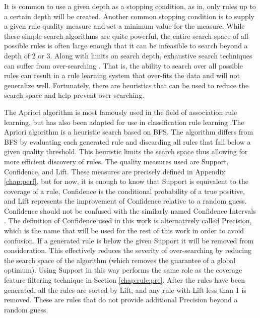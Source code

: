 It is common to use a given depth as a stopping condition, as in, only rules up to a certain depth will be created. Another common stopping condition is to supply a given rule quality measure and set a minimum value for the measure. While these simple search algorithms are quite powerful, the entire search space of all possible rules is often large enough that it can be infeasible to search beyond a depth of 2 or 3.
Along with limits on search depth, exhaustive search techniques can suffer from over-searching \cite{quinlan1995oversearching} \cite{janssen2008oversearching}. That is, the ability to search over all possible rules can result in a rule learning system that over-fits the data and will not generalize well.
 Fortunately, there are heuristics that can be used to reduce the search space and help prevent over-searching.

 The Apriori algorithm \cite{agrawal1996fast} is most famously used in the field of association rule learning, but has also been adapted for use in classification rule learning \cite{liu1998integrating} \cite{liu2000improving} \cite{jovanoski2001classification}.The Apriori algorithm is a heuristic search based on BFS. The algorithm differs from BFS by evaluating each generated rule and discarding all rules that fall below a given quality threshold. This heuristic limits the search space thus allowing for more efficient discovery of rules. The quality measures used are Support, Confidence, and Lift. These measures are precisely defined in Appendix \ref{chap:perf}, but for now, it is enough to know that Support is equivalent to the coverage of a rule, Confidence is the conditional probability of a true positive, and Lift represents the improvement of Confidence relative to a random guess.
 Confidence should not be confused with the similarly named Confidence Intervals \cite{gardner1986confidence}. The definition of Confidence used in this work is alternatively called Precision, which is the name that will be used for the rest of this work in order to avoid confusion.
 If a generated rule is below the given Support it will be removed from consideration. This effectively reduces the severity of over-searching by reducing the search space of the algorithm (which removes the guarantee of a global optimum). Using Support in this way performs the same role as the coverage feature-filtering technique in Section \ref{chap:rule:pre}. After the rules have been generated, all the rules are sorted by Lift, and any rule with Lift less than 1 is removed. These are rules that do not provide additional Precision beyond a random guess.

